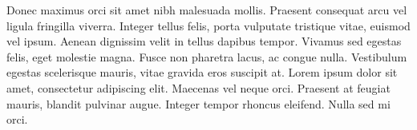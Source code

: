 \documentclass{lecnotes}
\begin{document}
	Donec maximus orci sit amet nibh malesuada mollis. Praesent consequat arcu vel ligula fringilla viverra. Integer tellus felis, porta vulputate tristique vitae, euismod vel ipsum. Aenean dignissim velit in tellus dapibus tempor. Vivamus sed egestas felis, eget molestie magna. Fusce non pharetra lacus, ac congue nulla. Vestibulum egestas scelerisque mauris, vitae gravida eros suscipit at. Lorem ipsum dolor sit amet, consectetur adipiscing elit. Maecenas vel neque orci. Praesent at feugiat mauris, blandit pulvinar augue. Integer tempor rhoncus eleifend. Nulla sed mi orci.
\end{document}
